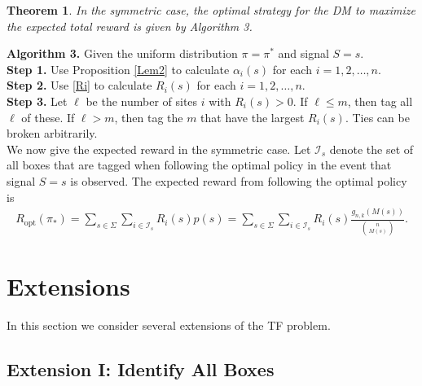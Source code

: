 \documentclass[a4paper,11pt]{article}
\newtheorem{thrm}{Theorem}
\begin{document}
\begin{thrm}
In the symmetric case, the optimal  strategy for the DM to maximize the expected total reward is given by Algorithm 3.
\end{thrm}

\noindent\textbf{Algorithm 3.} Given the uniform distribution $\pi=\pi^*$ and signal $S=s$.\\
\textbf{Step 1.} Use Proposition \ref{Lem2} to calculate $\alpha_i(s)$ for each $i=1,2,\dots,n$.\\
\textbf{Step 2.} Use \eqref{Ri} to calculate $R_i(s)$ for each $i=1,2,\dots,n$.\\
\textbf{Step 3.}  Let $\ell$ be the number of sites $i$ with $R_i(s)>0$. If $\ell\le m$, then tag all $\ell$ of these. If $\ell>m$, then tag the $m$ that have the largest $R_i(s)$. Ties can be broken arbitrarily.\\

We now give the expected reward in the symmetric case. Let $\mathcal I_s$ denote the set of all boxes that are tagged when following the optimal policy in the event that signal $S=s$ is observed. The expected reward from following the optimal policy is
\begin{eqnarray*}
R_{\mathrm{opt}}(\pi_*)  = \sum_{s\in\Sigma} \sum_{i\in\mathcal I_s} R_i(s) p(s) = \sum_{s\in\Sigma}\sum_{i\in\mathcal I_s} R_i(s)  \frac{g_{n,k}(M(s))}{{n\choose M(s)}}.
\end{eqnarray*}

\section{Extensions}\label{sec: Extensions}

In this section we consider several extensions of the TF problem.

\subsection{Extension I: Identify All Boxes}\label{sec: gen variant}
\end{document}
